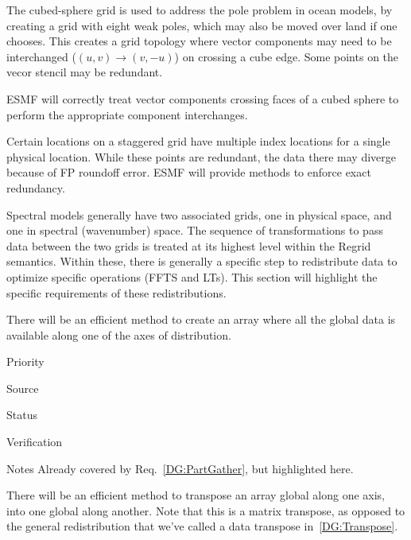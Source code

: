 
The cubed-sphere grid \cite{ref:rpm1996} is used to address the pole
problem in ocean models, by creating a grid with eight weak poles,
which may also be moved over land if one chooses. This creates a grid
topology where vector components may need to be interchanged
($(u,v)\longrightarrow(v,-u)$) on crossing a cube edge. Some points on
the vecor stencil may be redundant.


ESMF will correctly treat vector components crossing faces of a cubed
sphere to perform the appropriate component interchanges.


Certain locations on a staggered grid have multiple index locations
for a single physical location. While these points are redundant, the
data there may diverge because of FP roundoff error. ESMF will provide
methods to enforce exact redundancy.


Spectral models generally have two associated grids, one in physical
space, and one in spectral (wavenumber) space. The sequence of
transformations to pass data between the two grids is treated at its
highest level within the Regrid semantics. Within these, there is
generally a specific step to redistribute data to optimize specific
operations (FFTS and LTs). This section will highlight the specific
requirements of these redistributions.


There will be an efficient method to create an array where all the
global data is available along one of the axes of distribution.

\begin{reqlist}
\item[Priority]
\item[Source]
\item[Status]
\item[Verification]
\item[Notes] Already covered by Req.~\ref{DG:PartGather}, but
  highlighted here.
\end{reqlist}


There will be an efficient method to transpose an array global along
one axis, into one global along another. Note that this is a matrix
transpose, as opposed to the general redistribution that we've called
a data transpose in~\ref{DG:Transpose}.

